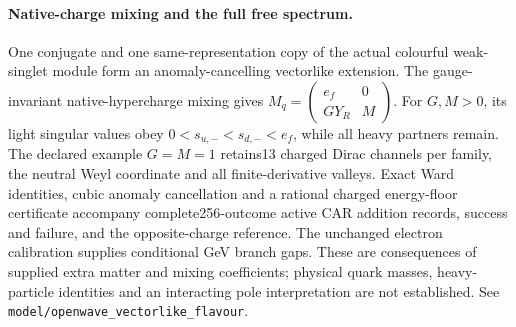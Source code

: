 \paragraph{Native-charge mixing and the full free spectrum.}
One conjugate and one same-representation copy of the actual colourful
weak-singlet module form an anomaly-cancelling vectorlike extension.
The gauge-invariant native-hypercharge mixing gives
$M_q=\left(\begin{smallmatrix}e_f&0\\GY_R&M\end{smallmatrix}\right)$.
For $G,M>0$, its light singular values obey
$0<s_{u,-}<s_{d,-}<e_f$, while all heavy partners remain.
The declared example $G=M=1$ retains13 charged Dirac channels per family,
the neutral Weyl coordinate and all finite-derivative valleys.
Exact Ward identities, cubic anomaly cancellation and a rational charged
energy-floor certificate accompany complete256-outcome active CAR addition
records, success and failure, and the opposite-charge reference.
The unchanged electron calibration supplies conditional GeV branch gaps.
These are consequences of supplied extra matter and mixing coefficients;
physical quark masses, heavy-particle identities and an interacting pole
interpretation are not established.
See \texttt{model/openwave\_vectorlike\_flavour}.
